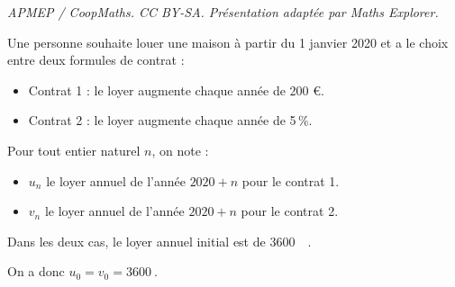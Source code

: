 \documentclass[10pt]{article}
\providecommand{\euro}{\texteuro}
\providecommand{\np}[2][]{{#2~#1}}
\providecommand{\euro}{{\text{€}}}
\providecommand{\no}{{\text{n°}}}
\renewcommand{\euro}{\ifmmode\text{\texteuro}\else\texteuro\fi}
\begin{document}
\noindent\textit{APMEP / CoopMaths. CC BY-SA. Présentation adaptée par Maths Explorer.}\par\medskip
\medskip

Une personne souhaite louer une maison à partir du 1 janvier 2020 et a le choix entre deux formules de contrat :

\begin{itemize}[label=\textbullet]
\item Contrat \no 1 : le loyer augmente chaque année de 200 €.
\item Contrat \no 2 : le loyer augmente chaque année de 5\,\%.
\end{itemize}

Pour tout entier naturel $n$, on note :

\begin{itemize}[label=\textbullet]
\item $u_n$ le loyer annuel de l'année $2020 + n$ pour le contrat \no 1.
\item $v_n$ le loyer annuel de l'année $2020 + n$ pour le contrat \no 2.
\end{itemize}

Dans les deux cas, le loyer annuel initial est de \np{3600}~\euro. 

On a donc $u_0 = v_0 = \np{3600}$.

\medskip
\end{document}

